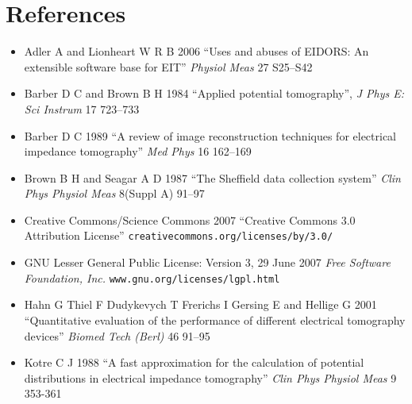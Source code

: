 \documentclass[letterpaper,twocolumn,11pt]{article}
\begin{document}
\section*{References}

\begin{itemize}
\item[]
Adler A and Lionheart W R B 2006
``Uses and abuses of EIDORS: An extensible software base for EIT''
{\em Physiol Meas}
27 S25--S42

\item[]
Barber D C and Brown B H 1984
``Applied potential tomography'', 
{\em J Phys E: Sci Instrum}
 17 723--733

\item[]
Barber D C 1989
``A review of image reconstruction techniques for electrical
 impedance tomography''
{\em Med Phys}
16 162--169

\item[]
Brown B H and Seagar A D 1987 
``The Sheffield data collection system''
{\em Clin Phys Physiol Meas}
 8(Suppl A) 91--97

\item[]
Creative Commons/Science Commons 2007
``Creative Commons 3.0 Attribution License''
\verb+creativecommons.org/licenses/by/3.0/+

\item[]
GNU Lesser General Public License: Version 3, 29 June 2007
{\em Free Software Foundation, Inc.}
\verb+www.gnu.org/licenses/lgpl.html+

\item[]
Hahn G Thiel F Dudykevych T Frerichs I Gersing E
and Hellige G 2001
``Quantitative evaluation of the performance of
different electrical tomography devices''
{\em  Biomed Tech (Berl)}
46 91--95


\item[]
Kotre C J 1988
``A fast approximation for the calculation of potential distributions in electrical impedance tomography''
{\em Clin Phys Physiol Meas}
9 353-361
\end{itemize}
\end{document}
